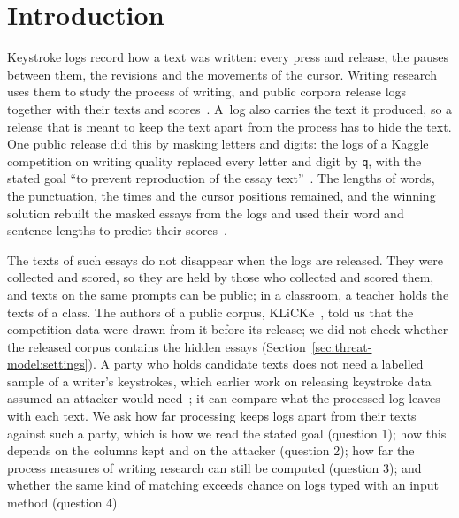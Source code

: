 \section{Introduction}
\label{sec:introduction}


Keystroke logs record how a text was written: every press and release, the pauses between them, the revisions and the
movements of the cursor. Writing research uses them to study the process of writing, and public corpora release logs
together with their texts and scores~\cite{tian2025klicke}. A~log also carries the text it produced, so a release
that is meant to keep the text apart from the process has to hide the text. One public release did this by masking
letters and digits:
the logs of a Kaggle competition on writing quality replaced every letter and digit by \texttt{q}, with the stated goal
``to prevent reproduction of the essay text''~\cite{kaggle2023lwp}. The lengths of words, the punctuation, the times
and the cursor positions remained, and the winning solution rebuilt the masked essays from the logs and used their
word and sentence lengths to predict their scores~\cite{inubushi2024first}.

The texts of such essays do not disappear when the logs are released. They were collected and scored, so they are held by
those who collected and scored them, and texts on the same prompts can be public; in a classroom, a teacher holds the
texts of a class. The authors of a public corpus, KLiCKe~\cite{tian2025klicke}, told us that the competition data were
drawn from it before its release; we did not check whether the released corpus contains the hidden essays
(Section~\ref{sec:threat-model:settings}). A party
who holds candidate texts does not need a labelled sample of a writer's keystrokes, which earlier work on releasing
keystroke data assumed an attacker would need~\cite{edwards2023csedm}; it can compare what the processed log leaves with
each text. We ask how far processing keeps logs apart from their texts against such a party, which is how we read the
stated goal (question 1); how this depends on the columns kept and on the attacker (question 2); how far the process
measures of writing research can still be computed (question 3); and whether the same kind of matching exceeds chance
on logs typed with an input method (question 4).

